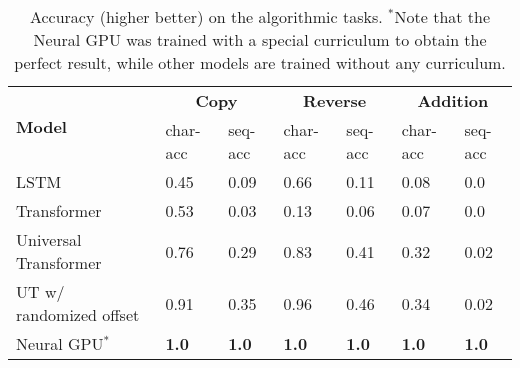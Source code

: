 \begin{table}
\centering
    \begin{tabular}{lllllll}
        & & & & & & \\ \toprule
        \multirow{2}{*}{ \bf Model } & \multicolumn{2}{c}{ \textbf{Copy} } & \multicolumn{2}{c}{ \textbf{Reverse} } & \multicolumn{2}{c}{ \textbf{Addition} } \\ \cmidrule(l{2pt}r{2pt}){2-3} \cmidrule(l{2pt}r{2pt}){4-5} \cmidrule(l{2pt}r{2pt}){6-7}
        & char-acc & seq-acc & char-acc & seq-acc & char-acc & seq-acc \\ \midrule
        LSTM & 0.45 & 0.09 & 0.66 & 0.11 & 0.08 & 0.0 \\
        Transformer & 0.53 & 0.03 & 0.13 & 0.06 & 0.07 & 0.0 \\
        Universal Transformer & 0.76 & 0.29 & 0.83 & 0.41 & 0.32 & 0.02 \\
        UT w/ randomized offset & 0.91 & 0.35 & 0.96 & 0.46 & 0.34 & 0.02 \\
        Neural GPU$^*$ & \textbf{1.0} & \textbf{1.0} & \textbf{1.0} & \textbf{1.0} & \textbf{1.0} &
        \textbf{1.0} \\ \bottomrule
    \end{tabular}
    \caption{Accuracy (higher better) on the algorithmic tasks. $^*$Note that the Neural GPU was trained with a special curriculum to obtain the perfect result, while other models are trained without any curriculum.}
    \label{tab:algorithmic}
\end{table}